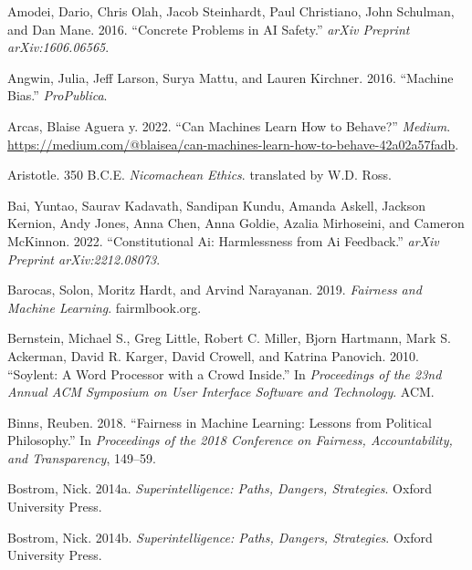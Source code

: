 \documentclass[
  letterpaper,
  DIV=11,
  numbers=noendperiod,
  oneside]{scrreprt}
\newlength{\cslhangindent}
\newenvironment{CSLReferences}[2] %
 {\begin{list}{}{%
  \setlength{\itemindent}{0pt}
  \setlength{\leftmargin}{0pt}
  \setlength{\parsep}{0pt}
  \ifodd #1
   \setlength{\leftmargin}{\cslhangindent}
   \setlength{\itemindent}{-1\cslhangindent}
  \fi
  \setlength{\itemsep}{#2\baselineskip}}}
 {\end{list}}
\theoremstyle{remark}
\begin{document}
\label{refs-5}
\begin{CSLReferences}{1}{0}
Amodei, Dario, Chris Olah, Jacob Steinhardt, Paul Christiano, John
Schulman, and Dan Mane. 2016. {``Concrete Problems in AI Safety.''}
\emph{arXiv Preprint arXiv:1606.06565}.

Angwin, Julia, Jeff Larson, Surya Mattu, and Lauren Kirchner. 2016.
{``Machine Bias.''} \emph{ProPublica}.

Arcas, Blaise Aguera y. 2022. {``Can Machines Learn How to Behave?''}
\emph{Medium}.
\url{https://medium.com/@blaisea/can-machines-learn-how-to-behave-42a02a57fadb}.

Aristotle. 350 B.C.E. \emph{Nicomachean Ethics}. translated by W.D.
Ross.

Bai, Yuntao, Saurav Kadavath, Sandipan Kundu, Amanda Askell, Jackson
Kernion, Andy Jones, Anna Chen, Anna Goldie, Azalia Mirhoseini, and
Cameron McKinnon. 2022. {``Constitutional Ai: {Harmlessness} from Ai
Feedback.''} \emph{arXiv Preprint arXiv:2212.08073}.

Barocas, Solon, Moritz Hardt, and Arvind Narayanan. 2019. \emph{Fairness
and Machine Learning}. fairmlbook.org.

Bernstein, Michael S., Greg Little, Robert C. Miller, Bjorn Hartmann,
Mark S. Ackerman, David R. Karger, David Crowell, and Katrina Panovich.
2010. {``Soylent: A Word Processor with a Crowd Inside.''} In
\emph{Proceedings of the 23nd Annual ACM Symposium on User Interface
Software and Technology}. ACM.

Binns, Reuben. 2018. {``Fairness in Machine Learning: Lessons from
Political Philosophy.''} In \emph{Proceedings of the 2018 Conference on
Fairness, Accountability, and Transparency}, 149--59.

Bostrom, Nick. 2014a. \emph{Superintelligence: Paths, Dangers,
Strategies}. Oxford University Press.

Bostrom, Nick. 2014b. \emph{Superintelligence: Paths, Dangers,
Strategies}. Oxford University Press.


\end{CSLReferences}
\end{document}
